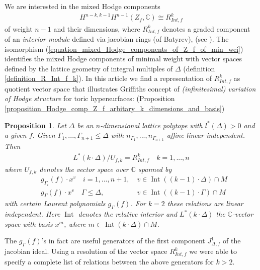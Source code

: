 \documentclass[12pt, english]{article}
\newtheorem{proposition}[definition]{Proposition}
\DeclareMathOperator{\Int}{Int}
\begin{document}
We are interested in the mixed Hodge components 
	\begin{align} \label{equation_mixed_Hodge_components_of_Z_f_of_min_wei}
		H^{n-k,k-1} H^{n-1}(Z_f, \mathbb{C}) \cong R_{Int,f}^{k}
	\end{align}
	of weight $n-1$ and their dimensions, where $R_{Int,f}^k$ denotes a graded component of an \textit{interior module} defined via jacobian rings (of Batyrev), (see \cite{Bat93}). The isomorphism (\ref{equation_mixed_Hodge_components_of_Z_f_of_min_wei}) identifies the mixed Hodge components of minimal weight with vector spaces defined by the lattice geometry of integral multiples of $\Delta$ (definition \ref{definition_R_Int_f_k}). In this article we find a representation of $R_{Int,f}^k$ as quotient vector space that illustrates Griffiths concept of \textit{(infinitesimal) variation of Hodge structure} for toric hypersurfaces: (Proposition \ref{proposition_Hodge_comp_Z_f_arbitary_k_dimensions_and_basis})

\begin{proposition} \label{proposition_Hodge_comp_Z_f_arbitary_k_dimensions_and_basis_intro}
	Let $\Delta$ be an $n$-dimensional lattice polytope with $l^*(\Delta) > 0$ and a given $f$. Given $\Gamma_1,...,\Gamma_{n+1} \leq \Delta$ with $n_{\Gamma_1},...,n_{\Gamma_{n+1}}$ affine linear independent. Then 
	\begin{align*}
		L^*(k \cdot \Delta) / U_{f,k} = R_{Int,f}^k \quad k=1,...,n
	\end{align*}
	where $U_{f,k}$ denotes the vector space over $\mathbb{C}$ spanned by
	\begin{align}
		& g_{\Gamma_i}(f) \cdot x^v \quad i=1,...,n+1, \quad v \in \Int((k-1) \cdot \Delta) \cap M \label{formula_relation_g_Gamma_i_f_the_1}	 \\
		& g_{\Gamma}(f) \cdot x^v \quad \Gamma \leq \Delta, \quad \quad \quad \quad \, \, \, \, v \in \Int((k-1) \cdot \Gamma) \cap M \label{formula_relation_g_Gamma_i_f_the_2}
	\end{align}
	with certain Laurent polynomials $g_{\Gamma}(f)$. For $k=2$ these relations are linear independent. Here $\Int$ denotes the relative interior and $L^*(k \cdot \Delta)$ the $\mathbb{C}$-vector space with basis $x^m$, where $m \in \Int(k \cdot \Delta) \cap M$.
\end{proposition}

The $g_{\Gamma}(f)$'s in fact are useful generators of the first component $J_{\Delta,f}^1$ of the jacobian ideal. %
Using a resolution of the vector space $R_{Int,f}^k$ we were able to specify a complete list of relations between the above generators for $k > 2$.
\leavevmode
\\
\end{document}
